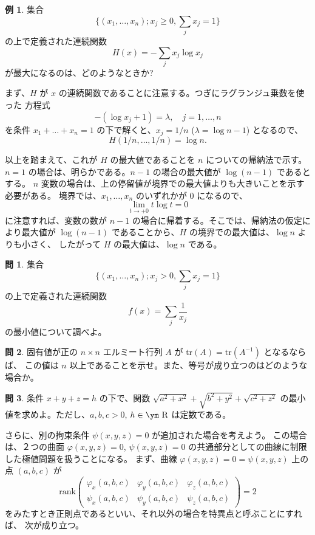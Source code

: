\documentclass[a4paper]{jsarticle}
\theoremstyle{definition}
\newtheorem{Example}[Theorem]{例}
\newtheorem{Exercise}{問}%
\theoremstyle{remark}
\newcommand{\R}{\text{\ym R}}
\begin{document}
\begin{Example} 
集合
\[
\{ (x_1,\dots,x_n); x_j \geq 0, \sum_j x_j = 1 \}
\]
の上で定義された連続関数
\[
H(x) = - \sum_j x_j\log x_j
\]
が最大になるのは、どのようなときか?

まず、$H$ が $x$ の連続関数であることに注意する。つぎにラグランジュ乗数を使った
方程式
\[
-(\log x_j +1) = \lambda, 
\quad j=1, \dots, n
\]
を条件 $x_1 + \dots + x_n = 1$ の下で解くと、$x_j = 1/n$ ($\lambda = \log n - 1$) となるので、
\[
H(1/n,\dots,1/n) = \log n. 
\]

以上を踏まえて、これが $H$ の最大値であることを $n$ についての帰納法で示す。
$n=1$ の場合は、明らかである。$n-1$ の場合の最大値が $\log(n-1)$ であるとする。
$n$ 変数の場合は、上の停留値が境界での最大値よりも大きいことを示す必要がある。
境界では、$x_1, \dots, x_n$ のいずれかが $0$ になるので、
\[
\lim_{t \to +0} t\log t = 0 
\]
に注意すれば、変数の数が $n-1$ の場合に帰着する。そこでは、帰納法の仮定により最大値が 
$\log (n-1)$ であることから、$H$ の境界での最大値は、$\log n$ よりも小さく、
したがって $H$ の最大値は、$\log n$ である。
\end{Example}

\begin{Exercise}
集合
\[
\{ (x_1,\dots, x_n); x_j >0, \sum_j x_j = 1 \}
\]
の上で定義された連続関数
\[
f(x) = \sum_j \frac{1}{x_j}
\]
の最小値について調べよ。 
\end{Exercise}

\begin{Exercise}
固有値が正の $n\times n$ エルミート行列 $A$ が
$\text{tr}(A) = \text{tr}(A^{-1})$ となるならば、
この値は $n$ 以上であることを示せ。また、等号が成り立つのはどのような場合か。
\end{Exercise}

\begin{Exercise}
条件 $x+y+z = h$ の下で、関数 $\sqrt{a^2 + x^2} + \sqrt{b^2 + y^2} + \sqrt{c^2 + z^2}$ 
の最小値を求めよ。ただし、$a,b,c >0$, $h \in \R$ は定数である。
\end{Exercise} 

さらに、別の拘束条件 $\psi(x,y,z) = 0$ が追加された場合を考えよう。
この場合は、２つの曲面 $\varphi(x,y,z) = 0$, $\psi(x,y,z) = 0$ の共通部分としての曲線に制限した極値問題を扱うことになる。
まず、曲線 $\varphi(x,y,z) = 0 = \psi(x,y,z)$ 上の点 $(a,b,c)$ が 
\[
\text{rank} 
\begin{pmatrix}
\varphi_x(a,b,c) & \varphi_y(a,b,c) & \varphi_z(a,b,c)\\ 
\psi_x(a,b,c) & \psi_y(a,b,c) & \psi_z(a,b,c)
\end{pmatrix} = 2 
\]
をみたすとき正則点であるといい、それ以外の場合を特異点と呼ぶことにすれば、
次が成り立つ。
\end{document}
